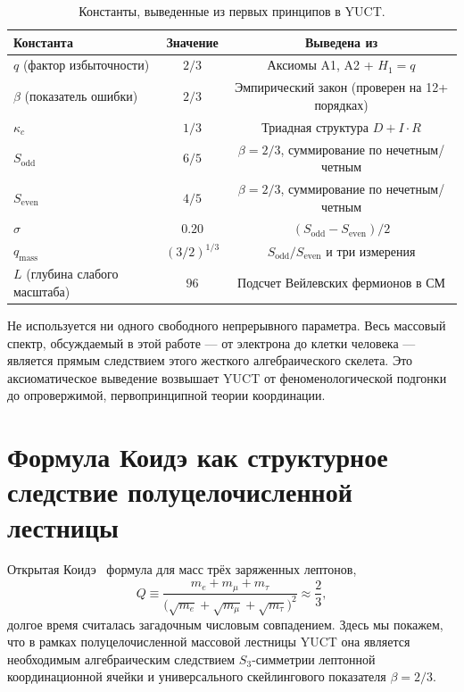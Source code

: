 \documentclass[11pt,a4paper]{article}
\begin{document}
	\begin{table}[H]
		\centering
		\caption{Константы, выведенные из первых принципов в YUCT.}
		\label{tab:derived-constants}
		\begin{tabular}{l c c}
			\toprule
			\textbf{Константа} & \textbf{Значение} & \textbf{Выведена из} \\
			\midrule
			\(q\) (фактор избыточности) & \(2/3\) & Аксиомы A1, A2 + \(H_1=q\) \\
			\(\beta\) (показатель ошибки) & \(2/3\) & Эмпирический закон (проверен на 12+ порядках) \\
			\(\kappa_c\) & \(1/3\) & Триадная структура \(D+I\!\cdot\!R\) \\
			\(S_{\mathrm{odd}}\) & \(6/5\) & \(\beta=2/3\), суммирование по нечетным/четным \\
			\(S_{\mathrm{even}}\) & \(4/5\) & \(\beta=2/3\), суммирование по нечетным/четным \\
			\(\sigma\) & \(0.20\) & \((S_{\mathrm{odd}}-S_{\mathrm{even}})/2\) \\
			\(q_{\text{mass}}\) & \((3/2)^{1/3}\) & \(S_{\mathrm{odd}}/S_{\mathrm{even}}\) и три измерения \\
			\(L\) (глубина слабого масштаба) & \(96\) & Подсчет Вейлевских фермионов в СМ \\
			\bottomrule
		\end{tabular}
	\end{table}
	
	Не используется ни одного свободного непрерывного параметра. Весь массовый спектр, обсуждаемый в этой работе — от электрона до клетки человека — является прямым следствием этого жесткого алгебраического скелета. Это аксиоматическое выведение возвышает YUCT от феноменологической подгонки до опровержимой, первопринципной теории координации.
	
\section{Формула Коидэ как структурное следствие полуцелочисленной лестницы}
\label{sec:koide}

Открытая Коидэ~\cite{Koide1983} формула для масс трёх заряженных лептонов,
\begin{equation}
	Q \equiv \frac{m_e + m_\mu + m_\tau}{\bigl(\sqrt{m_e} + \sqrt{m_\mu} + \sqrt{m_\tau}\bigr)^2}
	\approx \frac{2}{3},
\end{equation}
долгое время считалась загадочным числовым совпадением.  Здесь мы покажем,
что в рамках полуцелочисленной массовой лестницы YUCT она является
необходимым алгебраическим следствием $S_3$-симметрии лептонной
координационной ячейки и универсального скейлингового показателя
$\beta = 2/3$.
\end{document}

